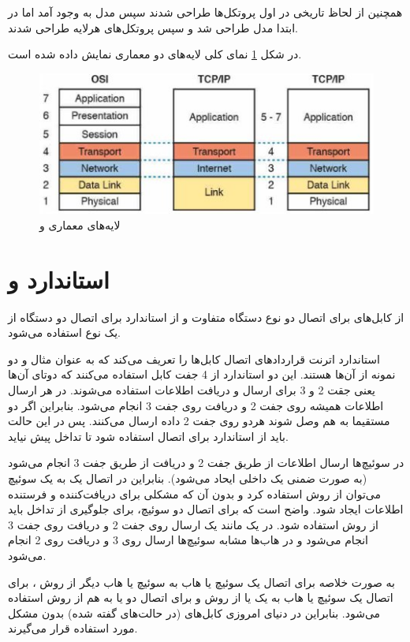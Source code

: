 \documentclass{article}
\begin{document}
همچنین از لحاظ تاریخی در  اول پروتکل‌ها طراحی شدند سپس مدل به وجود آمد اما در  ابتدا مدل طراحی شد و سپس پروتکل‌های هرلایه طراحی شدند.

\newpage

در شکل \ref{fig:layers} نمای کلی لایه‌های دو معماری نمایش داده شده است. 
\begin{figure}[h]
	\centering
	\includegraphics[width=0.6\columnwidth]{figs/osi-tcpip.jpg}
	\caption{لایه‌های معماری  و }
	\label{fig:layers}
\end{figure}

\section{استاندارد  و }
از کابل‌های  برای اتصال دو نوع دستگاه متفاوت و از استاندارد  برای اتصال دو دستگاه از یک نوع استفاده می‌شود.

استاندارد اترنت  قراردادهای اتصال کابل‌ها را تعریف می‌کند که به عنوان مثال  و  دو نمونه از آن‌ها هستند. این دو استاندارد از 4 جفت کابل  استفاده می‌کنند که دوتای آن‌ها یعنی جقت 2 و 3 برای ارسال و دریافت اطلاعات استفاده می‌شوند.
 در هر  ارسال اطلاعات همیشه روی جفت 2 و دریافت روی جفت 3 انجام می‌شود. بنابراین اگر دو  مستقیما به هم وصل شوند هردو روی جفت 2 داده ارسال می‌کنند. پس در این حالت باید از استاندارد  برای اتصال استفاده شود تا تداخل پیش نیاید.
 
 در سوئیچ‌ها ارسال اطلاعات از طریق جفت 2 و دریافت از طریق جفت 3 انجام می‌شود (به صورت ضمنی یک  داخلی ایحاد می‌شود). بنابراین در اتصال یک  به یک سوئیچ می‌توان از روش  استفاده کرد و بدون آن که مشکلی برای دریافت‌کننده و فرستنده اطلاعات ایجاد شود.
 واضح است که برای اتصال دو سوئیچ، برای جلوگیری از تداخل باید از روش  استفاده شود.
 در یک  مانند یک  ارسال روی جفت 2 و دریافت روی جفت 3 انجام می‌شود و در هاب‌ها مشابه سوئیچ‌ها ارسال روی 3 و دریافت روی 2 انجام می‌شود.
 
 به صورت خلاصه برای اتصال یک سوئیچ یا هاب به سوئیچ یا هاب دیگر از روش ، برای اتصال یک سوئیچ یا هاب به یک  یا  از روش  و برای اتصال دو  یا  به هم از روش  استفاده می‌شود.
 بنابراین در دنیای امروزی کابل‌های  (در حالت‌های گفته شده) بدون مشکل مورد استفاده قرار می‌گیرند.
\end{document}
